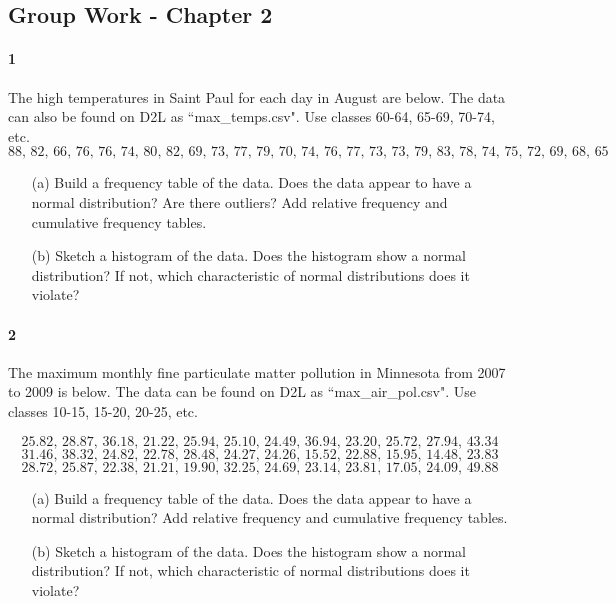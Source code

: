 \documentclass{article}
\begin{document}
\begin{flushleft}
\section*{Group Work - Chapter 2}
\paragraph{1} The high temperatures in Saint Paul for each day in August are below. The data can also be found on D2L as ``max\_temps.csv". Use classes 60-64, 65-69, 70-74, etc. 
\[88 ,\, 82 ,\, 66 ,\, 76 ,\, 76 ,\, 74 ,\, 80 ,\, 82 ,\, 69 ,\, 73 ,\, 77 ,\, 79 ,\, 70 ,\, 74 ,\, 76 ,\, 77 ,\, 73 ,\, 73 ,\, 79 ,\, 83 ,\, 78, \, 74 ,\, 75 ,\, 72 ,\, 69 ,\, 68 ,\, 65\]
\begin{itemize}
\item [(a)] Build a frequency table of the data. Does the data appear to have a normal distribution? Are there outliers? Add relative frequency and cumulative frequency tables.
\vspace{3in}
\item[(b)] Sketch a histogram of the data. Does the histogram show a normal distribution? If not, which characteristic of normal distributions does it violate?
\end{itemize}



\newpage
\paragraph{2} The maximum monthly fine particulate matter pollution in Minnesota from 2007 to 2009 is below. The data can be found on D2L as ``max\_air\_pol.csv". Use classes 10-15, 15-20, 20-25, etc. 

\[  25.82 ,\,  28.87 ,\, 36.18 ,\, 21.22 ,\, 25.94 ,\, 25.10 ,\, 24.49 ,\, 36.94 ,\, 23.20 ,\, 25.72 ,\, 27.94 ,\, 43.34 \] 
\[31.46 ,\, 38.32 ,\, 24.82 ,\, 22.78 ,\, 28.48 ,\, 24.27 ,\, 24.26 ,\, 15.52 ,\, 22.88 ,\, 15.95 ,\, 14.48 ,\, 23.83 \]
\[ 28.72 ,\, 25.87 ,\, 22.38 ,\, 21.21 ,\, 19.90 ,\, 32.25 ,\, 24.69 ,\, 23.14 ,\, 23.81 ,\, 17.05 ,\, 24.09 ,\, 49.88 \]
\begin{itemize}
\item [(a)] Build a frequency table of the data. Does the data appear to have a normal distribution? Add relative frequency and cumulative frequency tables.
\vspace{3in}
\item[(b)] Sketch a histogram of the data. Does the histogram show a normal distribution? If not, which characteristic of normal distributions does it violate?
\end{itemize}



\end{flushleft}
\end{document}
